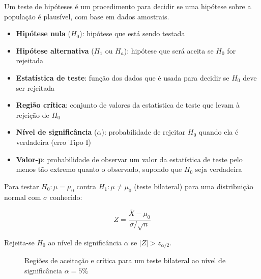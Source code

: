 \documentclass[a4paper,12pt]{article}
\begin{document}
Um teste de hipóteses é um procedimento para decidir se uma hipótese sobre a população é plausível, com base em dados amostrais.

\begin{itemize}
    \item \textbf{Hipótese nula} ($H_0$): hipótese que está sendo testada
    \item \textbf{Hipótese alternativa} ($H_1$ ou $H_a$): hipótese que será aceita se $H_0$ for rejeitada
    \item \textbf{Estatística de teste}: função dos dados que é usada para decidir se $H_0$ deve ser rejeitada
    \item \textbf{Região crítica}: conjunto de valores da estatística de teste que levam à rejeição de $H_0$
    \item \textbf{Nível de significância} ($\alpha$): probabilidade de rejeitar $H_0$ quando ela é verdadeira (erro Tipo I)
    \item \textbf{Valor-p}: probabilidade de observar um valor da estatística de teste pelo menos tão extremo quanto o observado, supondo que $H_0$ seja verdadeira
\end{itemize}

Para testar $H_0: \mu = \mu_0$ contra $H_1: \mu \neq \mu_0$ (teste bilateral) para uma distribuição normal com $\sigma$ conhecido:

\begin{equation}
Z = \frac{\overline{X} - \mu_0}{\sigma/\sqrt{n}}
\end{equation}

Rejeita-se $H_0$ ao nível de significância $\alpha$ se $|Z| > z_{\alpha/2}$.

\begin{figure}[H]
\centering
{}
\caption{Regiões de aceitação e crítica para um teste bilateral ao nível de significância $\alpha = 5\%$}
\end{figure}
\end{document}
